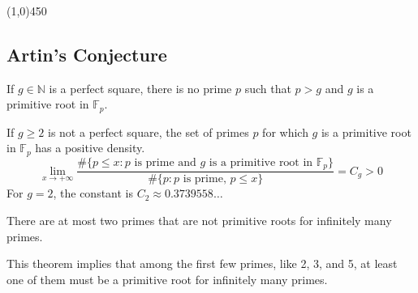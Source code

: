 \begin{center}
    \vspace{10pt}
    \line(1,0){450}
    \vspace{25pt}
\end{center}

\subsection*{Artin's Conjecture}

\begin{remark}
    If $g \in \mathbb{N}$ is a perfect square, there is no prime $p$ such that $p > g$ and $g$ is a primitive root in $\mathbb{F}_{p}$.
\end{remark}

\bigskip

\begin{theorem}
    If $g \geq 2$ is not a perfect square, the set of primes $p$ for which $g$ is a primitive root in $\mathbb{F}_{p}$ has a positive density.
    $$ \lim_{x \rightarrow +\infty}\frac{\#\{p \leq x : p \text{ is prime and } g \text{ is a primitive root in }\mathbb{F}_{p}\}}{\#\{p : p \text{ is prime, } p \leq x\}} = C_{g} > 0 $$
    For $g=2$, the constant is $C_{2} \approx 0.3739558\dots$
\end{theorem}

\bigskip

\begin{theorem}
    There are at most two primes that are not primitive roots for infinitely many primes.
\end{theorem}
\begin{remark}
    This theorem implies that among the first few primes, like 2, 3, and 5, at least one of them must be a primitive root for infinitely many primes.
\end{remark}